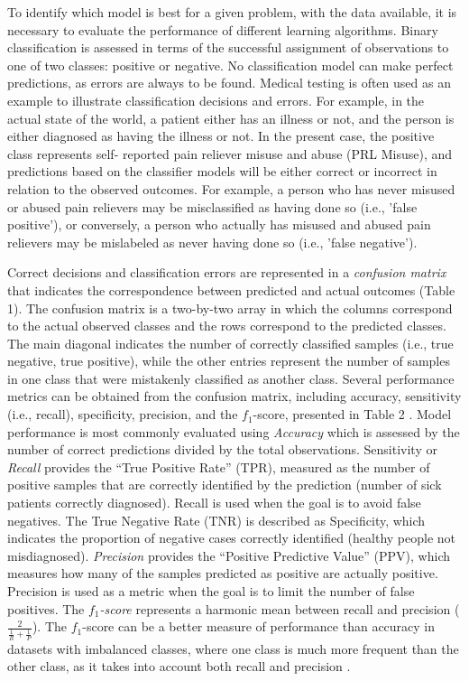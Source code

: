 To identify which model is best for a given problem, with the data available, 
it is necessary to evaluate the performance of different learning algorithms. 
Binary classification is assessed in terms of the successful assignment of 
observations to one of two classes: positive or negative. No classification 
model can make perfect predictions, as errors are always to be found. Medical 
testing is often used as an example to illustrate classification decisions 
and errors. For example, in the actual state of the world, a patient either 
has an illness or not, and the person is either diagnosed as having the 
illness or not. In the present case, the positive class represents self-
reported pain reliever misuse and abuse (PRL Misuse), and predictions based on 
the classifier models will be either correct or incorrect in relation to the 
observed outcomes. For example, a person who has never misused or abused pain 
relievers may be misclassified as having done so (i.e., 'false positive'), or 
conversely, a person who actually has misused and abused pain relievers may 
be mislabeled as never having done so (i.e., 'false negative').


Correct decisions and classification errors are represented in a 
\emph{confusion matrix} that indicates the correspondence between predicted 
and actual outcomes (Table 1). The confusion matrix is a two-by-two array in 
which the columns correspond to the actual observed classes and the rows 
correspond to the predicted classes. The main diagonal indicates the number 
of correctly classified samples (i.e., true negative, true positive), while 
the other entries represent the number of samples in one class that were 
mistakenly classified as another class. Several performance metrics can be 
obtained from the confusion matrix, including accuracy, sensitivity (i.e., 
recall), specificity, precision, and the $f_1$-score, presented in Table 2 
\cite{kuhn13, wiki18}. Model performance is most commonly evaluated using 
\emph{Accuracy} which is assessed by the number of correct predictions 
divided by the total observations. Sensitivity or \emph{Recall} provides the 
``True Positive Rate'' (TPR), measured as the number of positive samples that 
are correctly identified by the prediction (number of sick patients correctly
diagnosed). Recall is used when the goal is to avoid false negatives. The 
True Negative Rate (TNR) is described as Specificity, which indicates the 
proportion of negative cases correctly identified (healthy people not 
misdiagnosed). \emph{Precision} provides the ``Positive Predictive Value'' 
(PPV), which measures how many of the samples predicted as positive are 
actually positive. Precision is used as a metric when the goal is to limit
the number of false positives. The \emph{$f_1$-score} represents a harmonic 
mean between recall and precision (\(\frac{2}{ \frac{1}{R} + \frac{1}{P} }\)). 
The $f_1$-score can be a better measure of performance than accuracy in 
datasets with imbalanced classes, where one class is much more frequent 
than the other class, as it takes into account both recall and precision 
\cite{muller17, yun09}.

